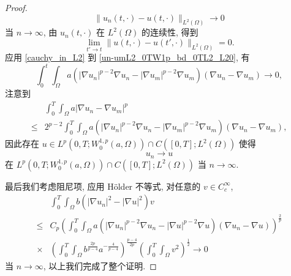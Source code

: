 \documentclass[twoside,longtitle]{LZUthesis}
\theoremstyle{definition}
\numberwithin{equation}{chapter}
\newcommand*\abs[1]{\lvert#1\rvert}
\newcommand*\norm[1]{\lVert#1\rVert}
\begin{document}
\begin{proof}
\begin{equation}
		\norm{u_n(t,\cdot)-u(t,\cdot)}_{L^2(\Omega)} \to 0
	\end{equation}
	当 $n \to \infty$, 由 $u_n(t, \cdot)$ 在
	 $L^2(\Omega)$ 的连续性, 得到
	\begin{equation}
		\lim_{t' \to t}\norm{u(t,\cdot)-u(t',\cdot)}_{L^2(\Omega)}=0.
	\end{equation}
	应用 \cref{cauchy_in_L2} 到 \cref{un-umL2_0TW1p_bd_0TL2_L20},
	有
	\begin{equation}\label{cauchy_in_W1pa}
		\int_{0}^{t}\int_{\Omega}a
		\left(\abs{\nabla u_n}^{p-2}\nabla u_n
		- \abs{\nabla u_m}^{p-2}\nabla u_m\right)
		\left(\nabla u_n - \nabla u_m\right)
		\to 0,
	\end{equation}
	注意到
	\begin{equation}
		\begin{split}
			& \int_0^T\int_{\Omega}a\abs{\nabla u_n - \nabla u_m}^p\\
			\leq{} & 2^{p-2}\int_{0}^{T}\int_{\Omega}a
			\left(\abs{\nabla u_n}^{p-2}\nabla u_n
			- \abs{\nabla u_m}^{p-2}\nabla u_m\right)
			\left(\nabla u_n - \nabla u_m\right),
		\end{split}
	\end{equation}
	因此存在 $u \in L^p(0, T; W_0^{1,p}(a,\Omega))
	\cap C([0, T]; L^2(\Omega))$ 使得
	\begin{equation}
		u_{n} \to u
	\end{equation}
	在 $L^p(0, T; W_0^{1,p}(a,\Omega))\cap C([0, T]; L^2(\Omega))$
	当 $n \to \infty$.

	最后我们考虑阻尼项, 应用 H\"older 不等式,
	对任意的 $v \in C_c^\infty$,
	\begin{equation}
		\begin{split}
			& \int_0^T\int_{\Omega}b\left(\abs{\nabla u_n}^2
			- \abs{\nabla u}^2\right)v\\
			\leq{} & C_p\left(\int_0^T\int_{\Omega}a
			\left(\abs{\nabla u_n}^{p-2}\nabla u_n
			- \abs{\nabla u}^{p-2}\nabla u\right)
			\left(\nabla u_n - \nabla u\right)\right)^{\frac{2}{p}}\\
			\times{} & \left(\int_0^T\int_{\Omega}b^{\frac{2p}{p-4}}a^{-\frac{4}{p-4}}\right)^{\frac{p-4}{2p}}
			\left(\int_0^T\int_{\Omega}v^2\right)^{\frac{1}{2}} \to 0
		\end{split}
	\end{equation}
	当 $n \to \infty$, 以上我们完成了整个证明.
\end{proof}
\end{document}
